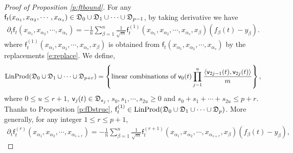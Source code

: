 \documentclass{article}
\numberwithin{equation}{section}
\newcommand{\fD}{{\frak D}}
\newcommand{\sff}{{\mathsf f}}
\newcommand{\sfv}{{\mathsf v}}
\newcommand{\al}{\alpha}
\renewcommand{\leq}{\leqslant}
\renewcommand{\geq}{\geqslant}
\newcommand{\cob}{\color{darkblue}}
\newcommand{\nc}{\normalcolor}
\newcommand{\del}{\partial}
\newcommand{\1}{\mathds{1}}
\theoremstyle{plain} %
\newcommand{\LinProd}{{\rm LinProd}}
\begin{document}
\begin{proof}[Proof of Proposition \ref{p:ftbound}]
For any $\sff_t(x_{\al_1}, x_{\al_2},\cdots, x_{\al_s})\in \fD_0\cup\fD_1\cup\cdots\cup \fD_{p-1}$, by taking derivative we have
\begin{align}\label{e:der1}
\del_t\sff_t(x_{\al_1}, x_{\al_2}, \cdots, x_{\al_s})
=-\frac{1}{n}\sum_{\beta=1}^n\frac{1}{\sqrt m}\sff_t^{(1)}(x_{\al_1}, x_{\al_2}, \cdots, x_{\al_s}, x_\beta)(f_\beta(t)-y_\beta).
\end{align}
where $\sff_t^{(1)}(x_{\al_1}, x_{\al_2}, \cdots, x_{\al_s}, x_\beta)$ is obtained from $\sff_t(x_{\al_1}, x_{\al_2}, \cdots, x_{\al_s})$ by the replacements \eqref{e:replace}. 
We define,
\begin{align*}
 \LinProd(\fD_0\cup\fD_1\cup\cdots\cup \fD_{p+r})
=
\left\{\text{linear combinations of }\sfv_0(t)\prod_{j=1}^u \frac{\langle\sfv_{2j-1}(t),\sfv_{2j}(t)\rangle}{m}\right\},
\end{align*}
where $0\leq u\leq r+1$, $\sfv_j(t)\in \fD_{s_j}$,  $s_0, s_1, \cdots, s_{2u}\geq 0$ and $s_0+s_1+\cdots+s_{2u}\leq p+r$.
Thanks to Proposition \ref{p:fDstruc}, $\sff_t^{(1)}\in \LinProd(\fD_0\cup\fD_1\cup\cdots\cup \fD_p)$. More generally, for any integer $1\leq r\leq p+1$,
%
%
\begin{align}\label{e:der2}
\del_t\sff_t^{(r)}(x_{\al_1}, x_{\al_2}, \cdots,x_{\al_{s+r}})
=-\frac{1}{n}\sum_{\beta=1}^n\frac{1}{\sqrt m}\sff_t^{(r+1)}(x_{\al_1}, x_{\al_2}, \cdots, x_{\al_{s+r}}, x_\beta)(f_\beta(t)-y_\beta),

\end{align}
\end{proof}
\end{document}
